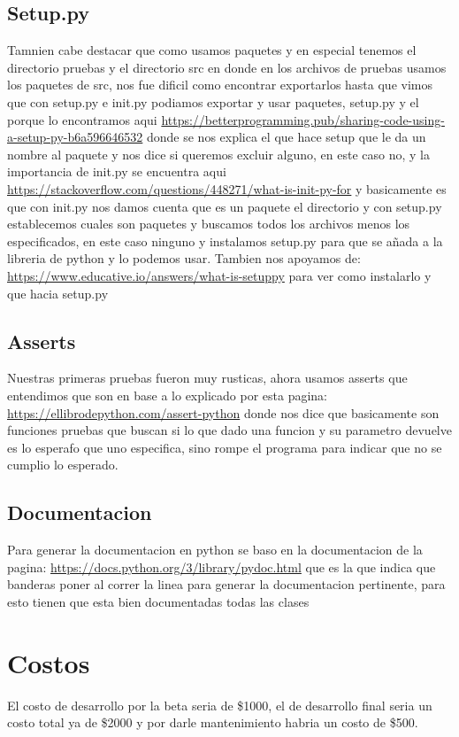 \documentclass[12pt]{article}
\begin{document}
\subsection{Setup.py}
Tamnien cabe destacar que como usamos paquetes y en especial tenemos el directorio pruebas y el directorio src en donde en los archivos de pruebas usamos los paquetes de src, nos fue dificil como encontrar exportarlos hasta que vimos que con setup.py e init.py podiamos exportar y usar paquetes, setup.py y el porque lo encontramos aqui \url{https://betterprogramming.pub/sharing-code-using-a-setup-py-b6a596646532} donde se nos explica el que hace setup que le da un nombre al paquete y nos dice si queremos excluir alguno, en este caso no, y la importancia de init.py se encuentra aqui \url{https://stackoverflow.com/questions/448271/what-is-init-py-for} y basicamente es que con init.py nos damos cuenta que es un paquete el directorio y con setup.py establecemos cuales son paquetes y buscamos todos los archivos menos los especificados, en este caso ninguno y instalamos setup.py para que se añada a la libreria de python y lo podemos usar. Tambien nos apoyamos de: \url{https://www.educative.io/answers/what-is-setuppy} para ver como instalarlo y que hacia setup.py
\subsection{Asserts}
Nuestras primeras pruebas fueron muy rusticas, ahora usamos asserts que entendimos que son en base a lo explicado por esta pagina: \url{https://ellibrodepython.com/assert-python} donde nos dice que basicamente son funciones pruebas que buscan si lo que dado una funcion y su parametro devuelve es lo esperafo que uno especifica, sino rompe el programa para indicar que no se cumplio lo esperado.
\subsection{Documentacion}
Para generar la documentacion en python se baso en la documentacion de la pagina: \url{https://docs.python.org/3/library/pydoc.html} que es la que indica que banderas poner al correr la linea para generar la documentacion pertinente, para esto tienen que esta bien documentadas todas las clases
\section{Costos}
El costo de desarrollo por la beta seria de \$1000, el de desarrollo final seria un costo total ya de \$2000 y por darle mantenimiento habria un costo de \$500.
\end{document}
